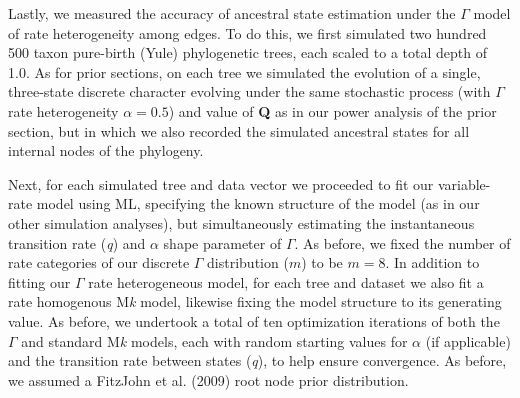 \documentclass[fleqn,10pt,lineno]{wlpeerj} %
\begin{document}
Lastly, we measured the accuracy of ancestral state estimation under the \(\Gamma\) model of rate heterogeneity among edges. To do this, we first simulated two hundred 500 taxon pure-birth (Yule) phylogenetic trees, each scaled to a total depth of 1.0. As for prior sections, on each tree we simulated the evolution of a single, three-state discrete character evolving under the same stochastic process (with \(\Gamma\) rate heterogeneity \(\alpha = 0.5\)) and value of \textbf{Q} as in our power analysis of the prior section, but in which we also recorded the simulated ancestral states for all internal nodes of the phylogeny.

Next, for each simulated tree and data vector we proceeded to fit our variable-rate model using ML, specifying the known structure of the model (as in our other simulation analyses), but simultaneously estimating the instantaneous transition rate (\emph{q}) and \(\alpha\) shape parameter of \(\Gamma\). As before, we fixed the number of rate categories of our discrete \(\Gamma\) distribution (\(m\)) to be \(m = 8\). In addition to fitting our \(\Gamma\) rate heterogeneous model, for each tree and dataset we also fit a rate homogenous M\emph{k} model, likewise fixing the model structure to its generating value. As before, we undertook a total of ten optimization iterations of both the \(\Gamma\) and standard M\emph{k} models, each with random starting values for \(\alpha\) (if applicable) and the transition rate between states (\emph{q}), to help ensure convergence. As before, we assumed a FitzJohn et al. (2009) root node prior distribution.
\end{document}
